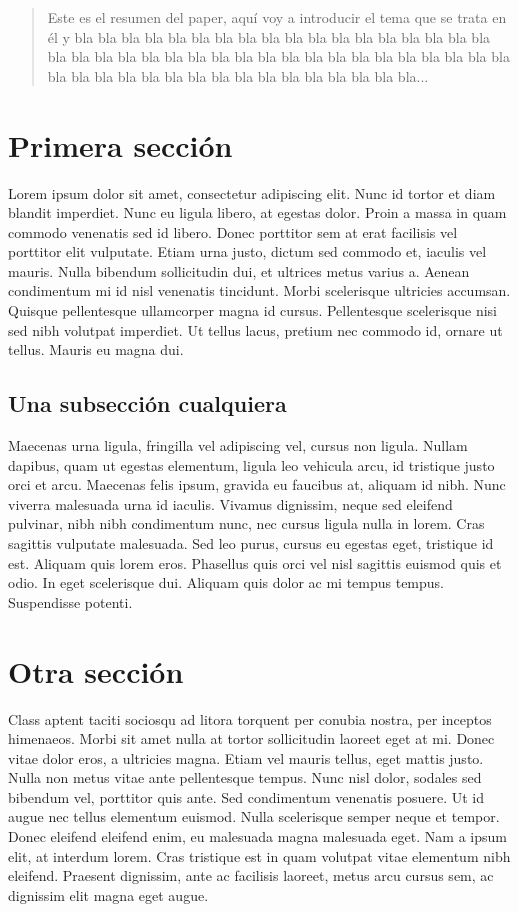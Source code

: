 \documentclass[a4paper,10pt]{article}
\begin{document}
\begin{abstract}
\noindent Este es el resumen del paper, aquí voy a introducir el tema que se trata en él y bla bla bla bla bla bla bla bla bla
 bla bla bla bla bla bla bla bla bla bla bla bla bla bla bla bla bla bla bla bla bla bla bla bla bla bla bla bla bla bla
 bla bla bla bla bla bla bla bla bla bla bla bla bla bla bla...
\end{abstract}






\section{Primera sección}
Lorem ipsum dolor sit amet, consectetur adipiscing elit. Nunc id tortor et diam blandit imperdiet. Nunc eu ligula libero, at egestas dolor. 
Proin a massa in quam commodo venenatis sed id libero. Donec porttitor sem at erat facilisis vel porttitor elit vulputate. Etiam urna justo, 
dictum sed commodo et, iaculis vel mauris. Nulla bibendum sollicitudin dui, et ultrices metus varius a. Aenean condimentum mi id nisl 
venenatis tincidunt. Morbi scelerisque ultricies accumsan. Quisque pellentesque ullamcorper magna id cursus. Pellentesque scelerisque nisi 
sed nibh volutpat imperdiet. Ut tellus lacus, pretium nec commodo id, ornare ut tellus. Mauris eu magna dui.

\subsection{Una subsección cualquiera}
Maecenas urna ligula, fringilla vel adipiscing vel, cursus non ligula. Nullam dapibus, quam ut egestas elementum, ligula leo vehicula arcu, 
id tristique justo orci et arcu. Maecenas felis ipsum, gravida eu faucibus at, aliquam id nibh. Nunc viverra malesuada urna id iaculis. 
Vivamus dignissim, neque sed eleifend pulvinar, nibh nibh condimentum nunc, nec cursus ligula nulla in lorem. Cras sagittis vulputate 
malesuada. Sed leo purus, cursus eu egestas eget, tristique id est. Aliquam quis lorem eros. Phasellus quis orci vel nisl sagittis euismod 
quis et odio. In eget scelerisque dui. Aliquam quis dolor ac mi tempus tempus. Suspendisse potenti.

\section{Otra sección}
Class aptent taciti sociosqu ad litora torquent per conubia nostra, per inceptos himenaeos. Morbi sit amet nulla at tortor sollicitudin 
laoreet eget at mi. Donec vitae dolor eros, a ultricies magna. Etiam vel mauris tellus, eget mattis justo. Nulla non metus vitae ante 
pellentesque tempus. Nunc nisl dolor, sodales sed bibendum vel, porttitor quis ante. Sed condimentum venenatis posuere. Ut id augue nec 
tellus elementum euismod. Nulla scelerisque semper neque et tempor. Donec eleifend eleifend enim, eu malesuada magna malesuada eget. Nam a 
ipsum elit, at interdum lorem. Cras tristique est in quam volutpat vitae elementum nibh eleifend. Praesent dignissim, ante ac facilisis 
laoreet, metus arcu cursus sem, ac dignissim elit magna eget augue.
\end{document}
